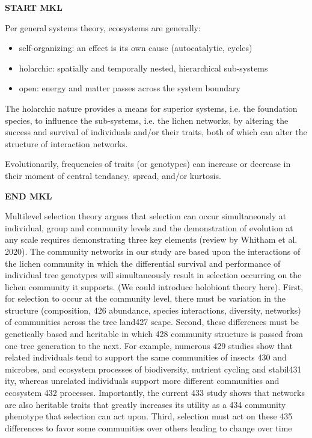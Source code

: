 \documentclass[fleqn,12pt]{olplainarticle}
\begin{document}
\textbf{START MKL}

Per general systems theory, ecosystems are generally:

\begin{itemize}
\item self-organizing: an effect is its own cause (autocatalytic, cycles)
\item holarchic: spatially and temporally nested, hierarchical  sub-systems
\item open: energy and matter passes across the system boundary
\end{itemize}

The holarchic nature provides a means for superior systems, i.e. the
foundation species, to influence the sub-systems, i.e. the lichen
networks, by altering the success and survival of individuals and/or
their traits, both of which can alter the structure of interaction
networks.

Evolutionarily, frequencies of traits (or genotypes) can increase or
decrease in their moment of central tendancy, spread, and/or
kurtosis. 

\textbf{END MKL}

Multilevel selection theory argues that selection can occur
simultaneously at individual, group and community levels and the
demonstration of evolution at any scale requires demonstrating three
key elements (review by Whitham et al. 2020). The community networks
in our study are based upon the interactions of the lichen community
in which the differential survival and performance of individual tree
genotypes will simultaneously result in selection occurring on the
lichen community it supports. (We could introduce holobiont theory
here). First, for selection to occur at the community level, there
must be variation in the structure (composition,
426 abundance, species interactions, diversity, networks) of
communities across the tree land427
scape. Second, these differences must be genetically based and
heritable in which
428 community structure is passed from one tree generation to the
next. For example, numerous
429 studies show that related individuals tend to support the same
communities of insects
430 and microbes, and ecosystem processes of biodiversity, nutrient
cycling and stabil431
ity, whereas unrelated individuals support more different communities
and ecosystem
432 processes. Importantly, the current
433 study shows that networks are also heritable traits that greatly
increases its utility as a
434 community phenotype that selection can act upon. Third, selection
must act on these
435 differences to favor some communities over others leading to
change over time
\end{document}

